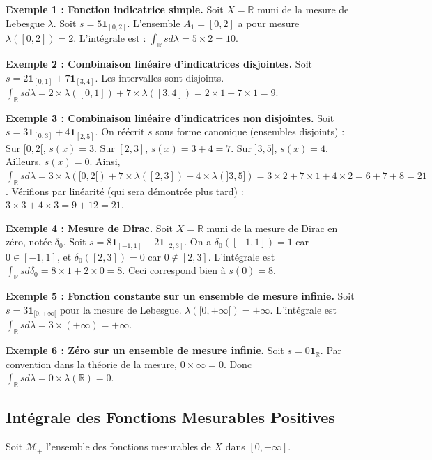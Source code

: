 \documentclass[11pt,a4paper]{article}
\begin{document}
\textbf{Exemple 1 : Fonction indicatrice simple.}
Soit $X = \mathbb{R}$ muni de la mesure de Lebesgue $\lambda$. Soit $s = 5 \mathbf{1}_{[0, 2]}$.
L'ensemble $A_1 = [0, 2]$ a pour mesure $\lambda([0, 2]) = 2$.
L'int\'egrale est : $\int_\mathbb{R} s d\lambda = 5 \times 2 = 10$.

\textbf{Exemple 2 : Combinaison lin\'eaire d'indicatrices disjointes.}
Soit $s = 2 \mathbf{1}_{[0, 1]} + 7 \mathbf{1}_{[3, 4]}$. Les intervalles sont disjoints.
$\int_\mathbb{R} s d\lambda = 2 \times \lambda([0, 1]) + 7 \times \lambda([3, 4]) = 2 \times 1 + 7 \times 1 = 9$.

\textbf{Exemple 3 : Combinaison lin\'eaire d'indicatrices non disjointes.}
Soit $s = 3 \mathbf{1}_{[0, 3]} + 4 \mathbf{1}_{[2, 5]}$. On r\'e\'ecrit $s$ sous forme canonique (ensembles disjoints) :
Sur $[0, 2[$, $s(x) = 3$.
Sur $[2, 3]$, $s(x) = 3 + 4 = 7$.
Sur $]3, 5]$, $s(x) = 4$.
Ailleurs, $s(x) = 0$.
Ainsi, $\int_\mathbb{R} s d\lambda = 3 \times \lambda([0, 2[) + 7 \times \lambda([2, 3]) + 4 \times \lambda(]3, 5]) = 3 \times 2 + 7 \times 1 + 4 \times 2 = 6 + 7 + 8 = 21$.
V\'erifions par lin\'earit\'e (qui sera d\'emontr\'ee plus tard) : $3 \times 3 + 4 \times 3 = 9 + 12 = 21$.

\textbf{Exemple 4 : Mesure de Dirac.}
Soit $X = \mathbb{R}$ muni de la mesure de Dirac en z\'ero, not\'ee $\delta_0$.
Soit $s = 8 \mathbf{1}_{[-1, 1]} + 2 \mathbf{1}_{[2, 3]}$.
On a $\delta_0([-1, 1]) = 1$ car $0 \in [-1, 1]$, et $\delta_0([2, 3]) = 0$ car $0 \notin [2, 3]$.
L'int\'egrale est $\int_\mathbb{R} s d\delta_0 = 8 \times 1 + 2 \times 0 = 8$. Ceci correspond bien \`a $s(0) = 8$.

\textbf{Exemple 5 : Fonction constante sur un ensemble de mesure infinie.}
Soit $s = 3 \mathbf{1}_{[0, +\infty[}$ pour la mesure de Lebesgue.
$\lambda([0, +\infty[) = +\infty$.
L'int\'egrale est $\int_\mathbb{R} s d\lambda = 3 \times (+\infty) = +\infty$.

\textbf{Exemple 6 : Z\'ero sur un ensemble de mesure infinie.}
Soit $s = 0 \mathbf{1}_\mathbb{R}$. Par convention dans la th\'eorie de la mesure, $0 \times \infty = 0$.
Donc $\int_\mathbb{R} s d\lambda = 0 \times \lambda(\mathbb{R}) = 0$.

\subsection*{Int\'egrale des Fonctions Mesurables Positives}

Soit $\mathcal{M}_+$ l'ensemble des fonctions mesurables de $X$ dans $[0, +\infty]$.
\end{document}
